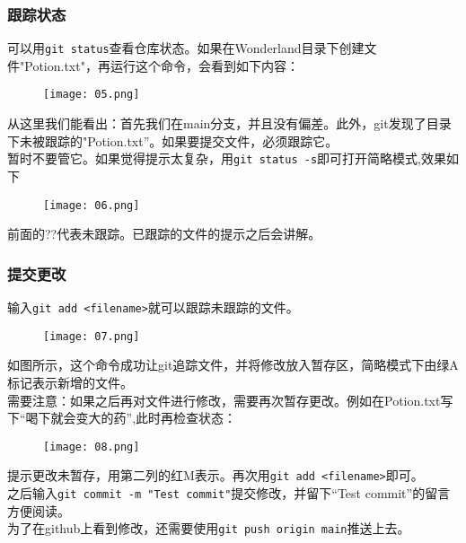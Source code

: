 \documentclass[a4paper, 12pt]{article}
\begin{document}
        \subsubsection{跟踪状态}
            可以用\verb|git status|查看仓库状态。如果在Wonderland目录下创建文件"Potion.txt"，再运行这个命令，会看到如下内容：\\
            \begin{figure}[H]
                \centering
                \texttt{[image: 05.png]}
                \label{img05}
            \end{figure}
            从这里我们能看出：首先我们在main分支，并且没有偏差。此外，git发现了目录下未被跟踪的"Potion.txt”。如果要提交文件，必须跟踪它。\\
            暂时不要管它。如果觉得提示太复杂，用\verb|git status -s|即可打开简略模式,效果如下\\
            \begin{figure}[H]
                \centering
                \texttt{[image: 06.png]}
                \label{img06}
            \end{figure}
            前面的??代表未跟踪。已跟踪的文件的提示之后会讲解。

        \subsubsection{提交更改}
            输入\verb|git add <filename>|就可以跟踪未跟踪的文件。\\
            \begin{figure}[H]
                \centering
                \texttt{[image: 07.png]}
                \label{img07}
            \end{figure}
            如图所示，这个命令成功让git追踪文件，并将修改放入暂存区，简略模式下由绿A标记表示新增的文件。\\
            需要注意：如果之后再对文件进行修改，需要再次暂存更改。例如在Potion.txt写下“喝下就会变大的药”,此时再检查状态：\\
            \begin{figure}[H]
                \centering
                \texttt{[image: 08.png]}
                \label{img08}
            \end{figure}
            提示更改未暂存，用第二列的红M表示。再次用\verb|git add <filename>|即可。\\
            之后输入\verb|git commit -m "Test commit"|提交修改，并留下“Test commit”的留言方便阅读。\\
            为了在github上看到修改，还需要使用\verb|git push origin main|推送上去。\\
\end{document}
